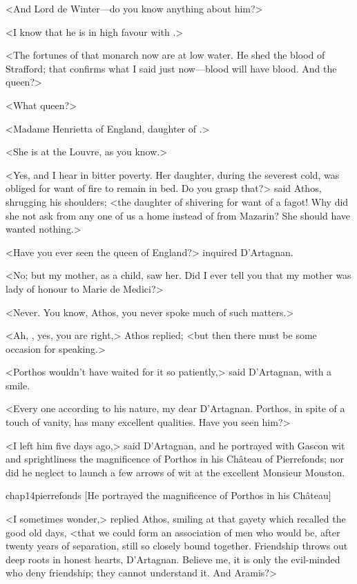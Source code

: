 <And Lord de Winter—do you know anything about him?>

<I know that he is in high favour with .>

<The fortunes of that monarch now are at low water. He shed the blood of Strafford; that confirms what I said just now—blood will have blood. And the queen?>

<What queen?>

<Madame Henrietta of England, daughter of .>

<She is at the Louvre, as you know.>

<Yes, and I hear in bitter poverty. Her daughter, during the severest cold, was obliged for want of fire to remain in bed. Do you grasp that?> said Athos, shrugging his shoulders; <the daughter of  shivering for want of a fagot! Why did she not ask from any one of us a home instead of from Mazarin? She should have wanted nothing.>

<Have you ever seen the queen of England?> inquired D'Artagnan.

<No; but my mother, as a child, saw her. Did I ever tell you that my mother was lady of honour to Marie de Medici?>

<Never. You know, Athos, you never spoke much of such matters.>

<Ah, , yes, you are right,> Athos replied; <but then there must be some occasion for speaking.>

<Porthos wouldn't have waited for it so patiently,> said D'Artagnan, with a smile.

<Every one according to his nature, my dear D'Artagnan. Porthos, in spite of a touch of vanity, has many excellent qualities. Have you seen him?>

<I left him five days ago,> said D'Artagnan, and he portrayed with Gascon wit and sprightliness the magnificence of Porthos in his Château of Pierrefonds; nor did he neglect to launch a few arrows of wit at the excellent Monsieur Mouston.

\begin{bwbigpic}
	[\basicscale] 
	{chap14pierrefonds}
	[He portrayed the magnificence of Porthos in his Château]
\end{bwbigpic}

<I sometimes wonder,> replied Athos, smiling at that gayety which recalled the good old days, <that we could form an association of men who would be, after twenty years of separation, still so closely bound together. Friendship throws out deep roots in honest hearts, D'Artagnan. Believe me, it is only the evil-minded who deny friendship; they cannot understand it. And Aramis?>

